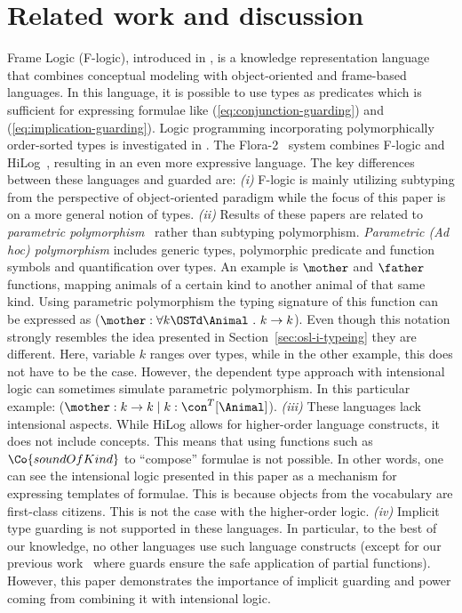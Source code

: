 \section{Related work and discussion}
\label{sec:related-work}

Frame Logic (F-logic), introduced in \cite{DBLP:conf/sigmod/KiferL89}, is a knowledge representation language that combines conceptual modeling with object-oriented and frame-based languages. 
In this language, it is possible to use types as predicates which is sufficient for expressing formulae like (\ref{eq:conjunction-guarding}) and (\ref{eq:implication-guarding}).
Logic programming incorporating polymorphically order-sorted types is investigated in \cite{DBLP:conf/alp/Smolka88}. 
The Flora-2~\cite{DBLP:journals/jacm/KiferLW95} system combines F-logic and HiLog~\cite{DBLP:journals/jlp/ChenKW93}, resulting in an even more expressive language.
The key differences between these languages and guarded \OSL are:
    \textit{(i)} F-logic is mainly utilizing subtyping from the perspective of object-oriented paradigm while the focus of this paper is on a more general notion of types.
    \textit{(ii)} Results of these papers are related to \emph{parametric polymorphism}~\cite[Chapter 23]{pierce2002types} rather than subtyping polymorphism.
    \emph{Parametric (Ad hoc) polymorphism} includes generic types,  polymorphic  predicate and function symbols %
    and quantification over types.
    An example is $\mother$ and $\father$ functions, mapping animals of a certain kind to another animal of that same kind. Using parametric polymorphism the typing signature of this function can be expressed as ($\mother : \forall k \OSTd \Animal \ .\ k \rightarrow k$). Even though this notation strongly resembles the idea presented in Section~\ref{sec:osl-i-typeing} they are different. Here, variable $k$ ranges over types, while in the other example, this does not have to be the case. However, the dependent type approach with intensional logic can sometimes simulate parametric polymorphism. In this particular example: ($\mother : k \rightarrow k \mid k : \con^T[\Animal]$).
    \textit{(iii)} These languages lack intensional aspects. While HiLog allows for higher-order language constructs, it does not include concepts. This means that using functions such as $\Co{soundOfKind}$ to ``compose'' formulae is not possible. 
    In other words, one can see the intensional logic presented in this paper as a mechanism for expressing templates of formulae. This is because objects from the vocabulary are first-class citizens. This is not the case with the higher-order logic.
    \textit{(iv)} Implicit type guarding is not supported in these languages. 
    In particular, to the best of our knowledge, no other languages use such language constructs (except for our previous work~\cite{DBLP:conf/jelia/MarkovicBD23} where guards ensure the safe application of partial functions).
    However, this paper demonstrates the importance of implicit guarding and power coming from combining it with intensional logic.

